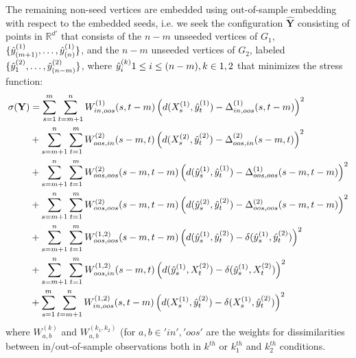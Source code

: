 \documentclass[12pt,oneside,final]{thesis}\usepackage[]{graphicx}\usepackage[]{color}
\begin{document}
The remaining non-seed vertices are embedded using out-of-sample embedding with respect to the embedded seeds, i.e. we seek the configuration ${ \hat{\mathbf{Y}}}$ consisting of points in $\mathbb{R}^{d'}$ that consists of the $n-m$ unseeded vertices of $G_1$,  $\{\hat{y}^{(1)}_{(m+1)},\ldots,\hat{y}^{(1)}_{(n)}\}$, and the $n-m$ unseeded vertices of $G_2$, labeled  $\{\hat{y}^{(2)}_1,\ldots,\hat{y}^{(2)}_{(n-m)}\}$, where $\hat{y}_{i}^{(k)} 1\leq i \leq (n-m), k \in {1,2}$  that minimizes the stress function:
\begin{align}
\sigma({\bf Y})&=\sum_{s=1}^{m}\sum_{t=m+1}^{n} {W^{(1)}_{in,oos}(s,t-m)  \left(d(X^{(1)}_{s},\hat{y}_t^{(1)})-{\Delta}^{(1)}_{in,oos}(s,t-m)\right)^2 } \label{eq:oos}\\
&+\sum_{s=m+1}^{n}\sum_{t=1}^{m}
{W^{(2)}_{oos,in}(s-m,t)  \left(d(X^{(2)}_{s},\hat{y}_t^{(2)})-{\Delta}^{(2)}_{oos,in}(s-m,t)\right)^2}  \label{eq:oos2}\\
&+\sum_{s=m+1}^{n}\sum_{t=1}^{m} 
{W^{(2)}_{oos,oos}(s-m,t-m) \left(d(\hat{y}_s^{(1)},\hat{y}_t^{(1)})-{\Delta}^{(1)}_{oos,oos}(s-m,t-m)\right)^2} \label{eq:oos3}\\
&+\sum_{s=m+1}^{n}\sum_{t=1}^{m} 
{W^{(2)}_{oos,oos}(s-m,t-m) \left(d(\hat{y}_s^{(2)},\hat{y}_t^{(2)})-{\Delta}^{(2)}_{oos,oos}(s-m,t-m)\right)^2} \label{eq:oos4} \\
&+\sum_{s=m+1}^{n} \sum_{t=1}^{m}
W^{(1,2)}_{oos,oos}(s-m,t-m) \left(d(\hat{y}_s^{(1)},\hat{y}_t^{(2)})-\delta(\hat{y}_s^{(1)},\hat{y}_t^{(2)})\right)^2 \label{eq:oos5}\\
&+\sum_{s=m+1}^{n} \sum_{t=1}^{m}
W^{(1,2)}_{oos,in}(s-m,t) \left(d(\hat{y}_s^{(1)},X^{(2)}_{t})-\delta(\hat{y}_s^{(1)},X^{(2)}_{t})\right)^2 \label{eq:oos6}\\
&+\sum_{s=1}^{m} \sum_{t=m+1}^{n}
W^{(1,2)}_{in,oos}(s,t-m) \left(d(X^{(1)}_{s},\hat{y}_t^{(2)})-\delta(X^{(1)}_{s},\hat{y}_t^{(2)})\right)^2 \label{eq:oos7}
\end{align}
where $W_{a,b}^{(k)}$ and $W_{a,b}^{(k_1,k_2)}$ (for $a,b \in {'in', 'oos'}$ are the weights for dissimilarities between in/out-of-sample observations both in $k^{th}$ or $k_1^{th}$ and $k_2^{th}$ conditions.
\end{document}
